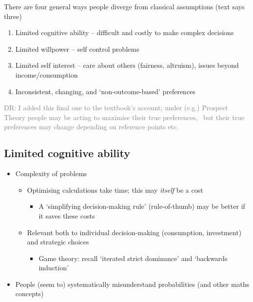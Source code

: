 \documentclass[]{article}
\providecommand{\tightlist}{%
  \setlength{\itemsep}{0pt}\setlength{\parskip}{0pt}}
\begin{document}
There are four general ways people diverge from classical assumptions
(text says three)

\begin{enumerate}
\def\labelenumi{\arabic{enumi}.}
\item
  Limited cognitive ability -- difficult and costly to make complex
  decisions
\item
  Limited willpower -- self control problems
\item
  Limited self interest -- care about others (fairness, altruism),
  issues beyond income/consumption
\item
  Inconsistent, changing, and `non-outcome-based' preferences
\end{enumerate}

\textcolor{gray}{DR: I added this final one to the textbook's account; under (e.g.) Prospect Theory people may be acting to maximise their true preferences, \
 but their true preferences may change depending on reference points etc.}

\hypertarget{limited-cognitive-ability}{%
\subsection{Limited cognitive ability}\label{limited-cognitive-ability}}

\begin{itemize}
\tightlist
\item
  Complexity of problems

  \begin{itemize}
  \tightlist
  \item
    Optimising calculations take time; this may \emph{itself} be a cost

    \begin{itemize}
    \tightlist
    \item
      A `simplifying decision-making rule' (rule-of-thumb) may be better
      if it saves these costs
    \end{itemize}
  \item
    Relevant both to individual decision-making (consumption,
    investment) and strategic choices

    \begin{itemize}
    \tightlist
    \item
      Game theory: recall `iterated strict dominance' and `backwards
      induction'
    \end{itemize}
  \end{itemize}
\item
  People (seem to) systematically misunderstand probabilities (and other
  maths concepts)
\end{itemize}
\end{document}

